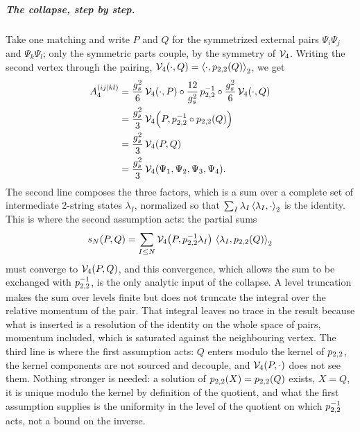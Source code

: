 \subparagraph{The collapse, step by step.}
Take one matching and write $P$ and $Q$ for the symmetrized external pairs $\Psi_i \Psi_j$ and $\Psi_k \Psi_l$; only the symmetric parts couple, by the symmetry of $\vertex{4}$.
Writing the second vertex through the pairing, $\vertex{4}(\cdot, Q) = \pair[2]{\cdot}{\sprod{2}{2}(Q)}$, we get
\begin{equation}
  \label{eq:ch2:amp:collapse}
  \begin{aligned}
    A_4^{(ij | kl)}
      &
      = \frac{\gs^2}{6} \, \vertex{4}(\cdot, P) \circ \frac{12}{\gs^2} \, \sprod{2}{2}^{-1} \circ \frac{\gs^2}{6} \, \vertex{4}(\cdot, Q)
    \\
      &
      = \frac{\gs^2}{3} \, \vertex{4} \Big( P, \sprod{2}{2}^{-1} \circ \sprod{2}{2}(Q) \Big)
    \\
      &
      = \frac{\gs^2}{3} \, \vertex{4}(P, Q)
    \\
      &
      = \frac{\gs^2}{3} \, \vertex{4}(\Psi_1, \Psi_2, \Psi_3, \Psi_4).
  \end{aligned}
\end{equation}
The second line composes the three factors, which is a sum over a complete set of intermediate $2$-string states $\lambda_I$, normalized so that $\sum_I \lambda_I \pair[2]{\lambda_I}{\cdot}$ is the identity.
This is where the second assumption acts: the partial sums
\begin{equation}
  \label{eq:ch2:amp:partial-sums}
  s_N(P, Q)
    = \sum_{I \le N} \vertex{4} \big( P, \sprod{2}{2}^{-1} \lambda_I \big) \, \pair[2]{\lambda_I}{\sprod{2}{2}(Q)}
\end{equation}
must converge to $\vertex{4}(P, Q)$, and this convergence, which allows the sum to be exchanged with $\sprod{2}{2}^{-1}$, is the only analytic input of the collapse.
A level truncation makes the sum over levels finite but does not truncate the integral over the relative momentum of the pair.
That integral leaves no trace in the result because what is inserted is a resolution of the identity on the whole space of pairs, momentum included, which is saturated against the neighbouring vertex.
The third line is where the first assumption acts: $Q$ enters modulo the kernel of $\sprod{2}{2}$, the kernel components are not sourced and decouple, and $\vertex{4}(P, \cdot)$ does not see them.
Nothing stronger is needed: a solution of $\sprod{2}{2}(X) = \sprod{2}{2}(Q)$ exists, $X = Q$, it is unique modulo the kernel by definition of the quotient, and what the first assumption supplies is the uniformity in the level of the quotient on which $\sprod{2}{2}^{-1}$ acts, not a bound on the inverse.
